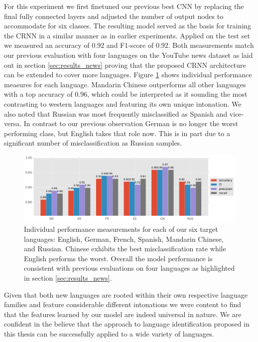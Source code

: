 For this experiment we first finetuned our previous best CNN by replacing the final fully connected layers and adjusted the number of output nodes to accommodate for six classes. The resulting model served as the basis for training the CRNN in a similar manner as in earlier experiments. Applied on the test set we measured an accuracy of 0.92 and F1-score of 0.92. Both measurements match our previous evaluation with four languages on the YouTube news dataset as laid out in section \ref{sec:results_news} proving that the proposed CRNN architecture can be extended to cover more languages. Figure \ref{fig:6lang} shows individual performance measures for each language. Mandarin Chinese outperforms all other languages with a top accuracy of 0.96, which could be interpreted as it sounding the most contrasting to western languages and featuring its own unique intonation. We also noted that Russian was most frequently misclassified as Spanish and vice-versa. In contrast to our previous observation German is no longer the worst performing class, but English takes that role now. This is in part due to a significant number of misclassification as Russian samples.

	\begin{figure}[]
  		\centering
    	\includegraphics[width=\textwidth, keepaspectratio]{plots/results_6lang_plot.pdf}
    	\caption{Individual performance measurements for each of our six target languages: English, German, French, Spanish, Mandarin Chinese, and Russian. Chinese exhibits the best misclassification rate while English performs the worst. Overall the model performance is consistent with previous evaluations on four languages as highlighted in section \ref{sec:results_news}.}
    	\label{fig:6lang}
	\end{figure}

Given that both new languages are rooted within their own respective language families and feature considerable different intonations we were content to find that the features learned by our model are indeed universal in nature. We are confident in the believe that the approach to language identification proposed in this thesis can be successfully applied to a wide variety of languages.

